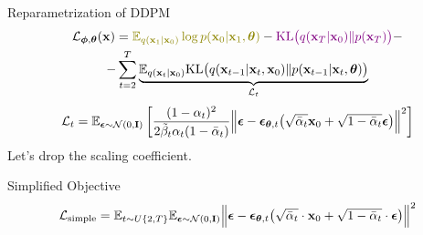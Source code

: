 \documentclass{beamer}
\begin{document}
\begin{frame}{Reparametrization of DDPM}
    \begin{multline*}
        \cL_{\bphi, \btheta}(\bx) =  {\color{olive}\bbE_{q(\bx_1 | \bx_0)} \log p(\bx_0 | \bx_1, \btheta)} - {\color{violet}\KL\bigl(q(\bx_T | \bx_0) \| p(\bx_T)\bigr)} - \\
        - \sum_{t=2}^T \underbrace{ \bbE_{q(\bx_t | \bx_0)} \KL \bigl(q(\bx_{t-1} | \bx_t, \bx_0) \| p(\bx_{t - 1} | \bx_t, \btheta )\bigr)}_{\cL_t}
    \end{multline*}
    \vspace{-0.3cm}
    \[
        \mathcal{L}_t  = \mathbb{E}_{\boldsymbol{\epsilon} \sim \mathcal{N}(0, \mathbf{I})} \left[ \frac{(1 - \alpha_t)^2}{2\tilde{\beta}_t \alpha_t (1 - \bar{\alpha}_t)} \Bigl\| \boldsymbol{\epsilon} - \boldsymbol{\epsilon}_{\boldsymbol{\theta}, t}\bigl( \sqrt{\bar{\alpha}_t} \mathbf{x}_0 + \sqrt{1 - \bar{\alpha}_t} \boldsymbol{\epsilon}\bigr) \Bigr\|^2 \right]
    \]
    Let's drop the scaling coefficient.
    \begin{block}{Simplified Objective}
        \vspace{-0.3cm}
        \[
             \mathcal{L}_{\text{simple}} = \mathbb{E}_{t \sim U\{2, T\}} \mathbb{E}_{\boldsymbol{\epsilon} \sim \mathcal{N}(0, \mathbf{I})} \Bigl\| \boldsymbol{\epsilon} - \boldsymbol{\epsilon}_{\boldsymbol{\theta}, t}\bigl( \sqrt{\bar{\alpha}_t} \cdot \mathbf{x}_0 + \sqrt{1 - \bar{\alpha}_t} \cdot \boldsymbol{\epsilon}\bigr) \Bigr\|^2 
        \]
    \end{block}
\end{frame}
\end{document}
